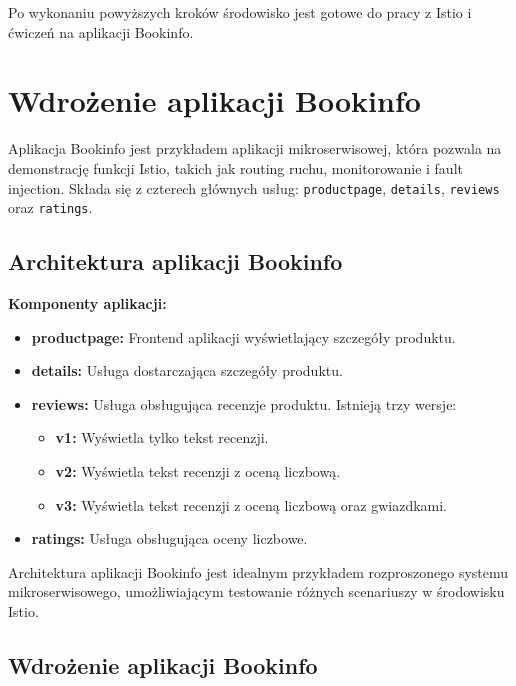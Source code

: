 \documentclass{article}
\begin{document}
Po wykonaniu powyższych kroków środowisko jest gotowe do pracy z Istio i ćwiczeń na aplikacji Bookinfo.

\section{Wdrożenie aplikacji Bookinfo}

Aplikacja Bookinfo jest przykładem aplikacji mikroserwisowej, która pozwala na demonstrację funkcji Istio, takich jak routing ruchu, monitorowanie i fault injection. Składa się z czterech głównych usług: \texttt{productpage}, \texttt{details}, \texttt{reviews} oraz \texttt{ratings}.

\subsection{Architektura aplikacji Bookinfo}

\textbf{Komponenty aplikacji:}
\begin{itemize}
    \item \textbf{productpage:} Frontend aplikacji wyświetlający szczegóły produktu.
    \item \textbf{details:} Usługa dostarczająca szczegóły produktu.
    \item \textbf{reviews:} Usługa obsługująca recenzje produktu. Istnieją trzy wersje:
    \begin{itemize}
        \item \textbf{v1:} Wyświetla tylko tekst recenzji.
        \item \textbf{v2:} Wyświetla tekst recenzji z oceną liczbową.
        \item \textbf{v3:} Wyświetla tekst recenzji z oceną liczbową oraz gwiazdkami.
    \end{itemize}
    \item \textbf{ratings:} Usługa obsługująca oceny liczbowe.
\end{itemize}

Architektura aplikacji Bookinfo jest idealnym przykładem rozproszonego systemu mikroserwisowego, umożliwiającym testowanie różnych scenariuszy w środowisku Istio.

\subsection{Wdrożenie aplikacji Bookinfo}
\end{document}
